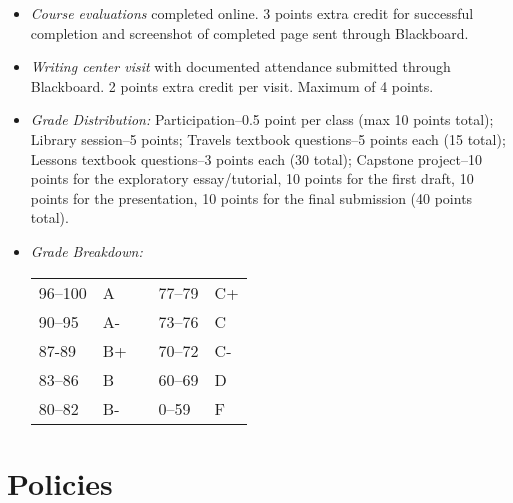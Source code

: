 \documentclass[article,oneside]{memoir}
\begin{document}
\begin{itemize}
\item \textit{Course evaluations} completed online. 3 points extra credit for successful completion and screenshot of completed page sent through Blackboard. 

\item \textit{Writing center visit} with documented attendance submitted through Blackboard. 2 points extra credit per visit. Maximum of 4 points.  


\item \textit{Grade Distribution:}  Participation--0.5 point per class (max 10 points total); Library session--5 points; Travels textbook questions--5 points each (15 total); Lessons textbook questions--3 points each (30 total); Capstone project--10 points for the exploratory essay/tutorial, 10 points for the first draft, 10 points for the presentation, 10 points for the final submission (40 points total).

\item \textit{Grade Breakdown:}

 \begin{tabular}{ | l | l | p{2cm} | l | l | }
    \hline 
96--100 & A  & &  77--79 &  C+ \\  
90--95 & A- & &  73--76 & C \\
87-89 & B+ &  &  70--72 & C- \\ 
83--86 & B  & &  60--69 & D\\
80--82 & B- & & 0--59 & F\\ \hline
    \end{tabular}


\end{itemize}





\section{Policies}
\end{document}
